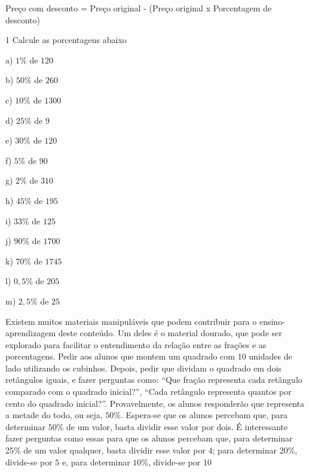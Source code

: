 Preço com desconto = Preço original - (Preço original x Porcentagem de
desconto)


\num{1}  Calcule as porcentagens abaixo

\begin{multicols}{3}\baselineskip 
a) $1\%$ de $120$

b) $50\%$ de $260$

c) $10\%$ de $1300$

d) $25\%$ de $9$

e) $30\%$ de $120$

f) $5\%$ de $90$

g) $2\%$ de $310$

h) $45\%$ de $195$

i) $33\%$ de $125$

j) $90\%$ de $1700$

k) $70\%$ de $1745$

l) $0,5\%$ de $205$

m) $2,5\%$ de $25$
\end{multicols}
















Existem muitos materiais manipuláveis que podem contribuir para o
ensino-aprendizagem deste conteúdo. Um deles é o material dourado, que
pode ser explorado para facilitar o entendimento da relação entre as
frações e as porcentagens. Pedir aos alunos que montem um quadrado com
10 unidades de lado utilizando os cubinhos. Depois, pedir que dividam o
quadrado em dois retângulos iguais, e fazer perguntas como: ``Que fração
representa cada retângulo comparado com o quadrado inicial?'', ``Cada
retângulo representa quantos por cento do quadrado inicial?''.
Provavelmente, os alunos responderão que representa a metade do todo, ou
seja, $50\%$. Espera-se que os alunos percebam que, para determinar $50\%$
de um valor, basta dividir esse valor por dois. É interessante fazer
perguntas como essas para que os alunos percebam que, para determinar
25\% de um valor qualquer, basta dividir esse valor por $4$; para
determinar $20\%$, divide-se por $5$ e, para determinar $10\%$, divide-se por
10

